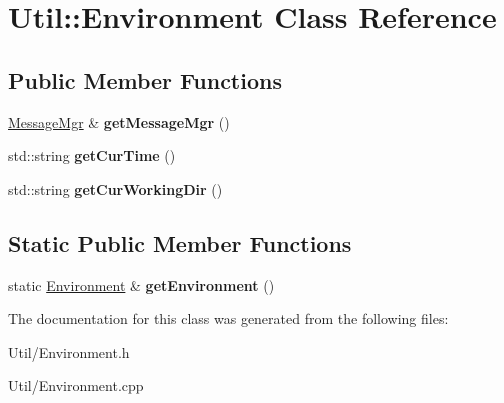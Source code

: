\hypertarget{class_util_1_1_environment}{}\section{Util\+:\+:Environment Class Reference}
\label{class_util_1_1_environment}
\subsection*{Public Member Functions}
\begin{DoxyCompactItemize}
\item 
\hyperlink{class_util_1_1_message_mgr}{Message\+Mgr} \& {\bfseries get\+Message\+Mgr} ()\hypertarget{class_util_1_1_environment_aeabf16ed6959da86effea699c19b79f5}{}\label{class_util_1_1_environment_aeabf16ed6959da86effea699c19b79f5}

\item 
std\+::string {\bfseries get\+Cur\+Time} ()\hypertarget{class_util_1_1_environment_ae193832a3b616c6608bc0b89852bb656}{}\label{class_util_1_1_environment_ae193832a3b616c6608bc0b89852bb656}

\item 
std\+::string {\bfseries get\+Cur\+Working\+Dir} ()\hypertarget{class_util_1_1_environment_ae6c30571579f59b4fe149b90387bf864}{}\label{class_util_1_1_environment_ae6c30571579f59b4fe149b90387bf864}

\end{DoxyCompactItemize}
\subsection*{Static Public Member Functions}
\begin{DoxyCompactItemize}
\item 
static \hyperlink{class_util_1_1_environment}{Environment} \& {\bfseries get\+Environment} ()\hypertarget{class_util_1_1_environment_a9a0f53217764e53a1169422b0d3fc6fe}{}\label{class_util_1_1_environment_a9a0f53217764e53a1169422b0d3fc6fe}

\end{DoxyCompactItemize}


The documentation for this class was generated from the following files\+:\begin{DoxyCompactItemize}
\item 
Util/Environment.\+h\item 
Util/Environment.\+cpp\end{DoxyCompactItemize}
